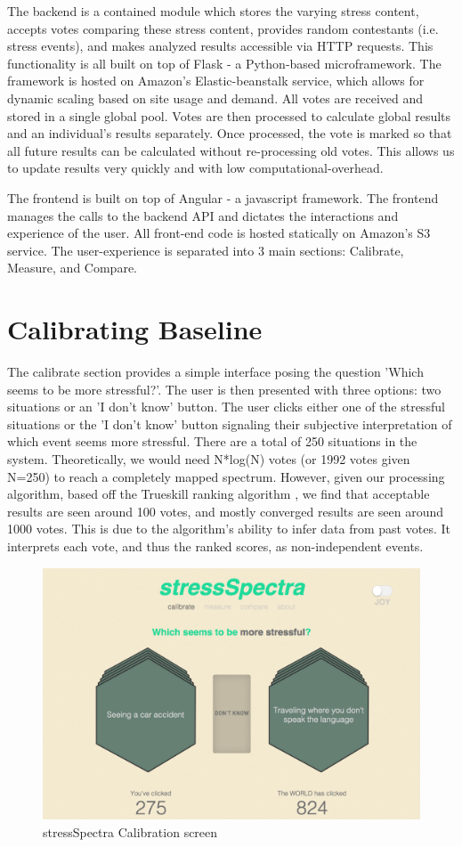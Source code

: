 \documentclass{sigchi}
\begin{document}
The backend is a contained module which stores the varying stress content, accepts votes comparing these stress content, provides random contestants (i.e. stress events), and makes analyzed results accessible via HTTP requests. This functionality is all built on top of Flask \cite{flask} - a Python-based microframework. The framework is hosted on Amazon's Elastic-beanstalk service, which allows for dynamic scaling based on site usage and demand. All votes are received and stored in a single global pool. Votes are then processed to calculate global results and an individual's results separately. Once processed, the vote is marked so that all future results can be calculated without re-processing old votes. This allows us to update results very quickly and with low computational-overhead. 

The frontend is built on top of Angular \cite{angular} - a javascript framework. The frontend manages the calls to the backend API and dictates the interactions and experience of the user. All front-end code is hosted statically on Amazon's S3 service. The user-experience is separated into 3 main sections: Calibrate, Measure, and Compare. 


\section{Calibrating Baseline}
The calibrate section provides a simple interface posing the question 'Which seems to be more stressful?'. The user is then presented with three options: two  situations or an 'I don't know' button. The user clicks either one of the stressful situations or the 'I don't know' button signaling their subjective interpretation of which event seems more stressful. There are a total of 250 situations in the system. Theoretically, we would need N*log(N) votes (or 1992 votes given N=250) to reach a completely mapped spectrum. However, given our processing algorithm, based off the Trueskill ranking algorithm \cite{herbrich2006trueskill}, we find that acceptable results are seen around 100 votes, and mostly converged results are seen around 1000 votes. This is due to the algorithm's ability to infer data from past votes. It interprets each vote, and thus the ranked scores, as non-independent events.
\begin{figure}[!h]
\centering
\includegraphics[width=0.9\columnwidth]{calibrate}
\caption{stressSpectra Calibration screen}
\label{fig:calibrate}
\end{figure}
\end{document}
